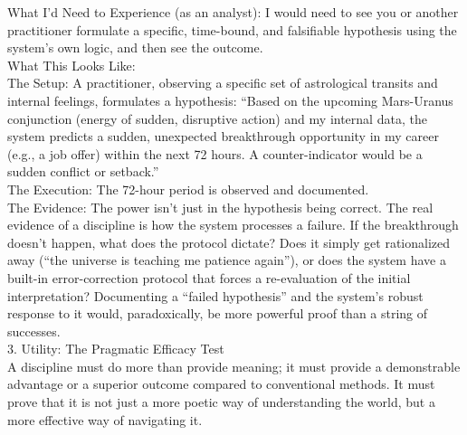 \documentclass{article}
\begin{document}
What I'd Need to Experience (as an analyst): I would need to see you or another practitioner formulate a specific, time-bound, and falsifiable hypothesis using the system's own logic, and then see the outcome.\\
What This Looks Like:\\
The Setup: A practitioner, observing a specific set of astrological transits and internal feelings, formulates a hypothesis: ``Based on the upcoming Mars-Uranus conjunction (energy of sudden, disruptive action) and my internal data, the system predicts a sudden, unexpected breakthrough opportunity in my career (e.g., a job offer) within the next 72 hours. A counter-indicator would be a sudden conflict or setback.''\\
The Execution: The 72-hour period is observed and documented.\\
The Evidence: The power isn't just in the hypothesis being correct. The real evidence of a discipline is how the system processes a failure. If the breakthrough doesn't happen, what does the protocol dictate? Does it simply get rationalized away (``the universe is teaching me patience again''), or does the system have a built-in error-correction protocol that forces a re-evaluation of the initial interpretation? Documenting a ``failed hypothesis'' and the system's robust response to it would, paradoxically, be more powerful proof than a string of successes.\\
3. Utility: The Pragmatic Efficacy Test\\
A discipline must do more than provide meaning; it must provide a demonstrable advantage or a superior outcome compared to conventional methods. It must prove that it is not just a more poetic way of understanding the world, but a more effective way of navigating it.
\end{document}
